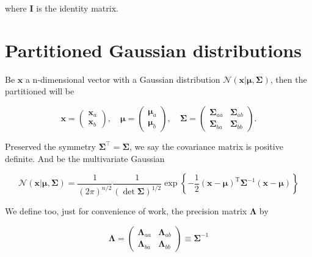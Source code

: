 \begin{appendices}
where $\mathbf{I}$ is the identity matrix.

\vspace{4em}

  \section{Partitioned Gaussian distributions\cite{schon_lindsten}}
  \label{subsec:app-par-gau}

  Be $\mathbf{x}$ a n-dimensional vector with a Gaussian distribution $\mathcal{N}\left( \mathbf{x} | \boldsymbol{\mu}, \boldsymbol{\Sigma} \right)$, then the partitioned will be
  
  \begin{equation}
    \mathbf{x}=
    \begin{pmatrix}
    \mathbf{x}_a \\  
    \mathbf{x}_b 
    \end{pmatrix}
    ,\quad 
    \boldsymbol{\mu}=
    \begin{pmatrix}
      \boldsymbol{\mu}_a \\
      \boldsymbol{\mu}_b
    \end{pmatrix}
    ,\quad 
    \boldsymbol{\Sigma}=
    \begin{pmatrix}
      \boldsymbol{\Sigma}_{aa} & \boldsymbol{\Sigma}_{ab}  \\
      \boldsymbol{\Sigma}_{ba} & \boldsymbol{\Sigma}_{bb}
    \end{pmatrix}
    .
  \end{equation}

  Preserved the symmetry $\boldsymbol{\Sigma}^\top = \boldsymbol{\Sigma}$, we say the covariance matrix is positive definite. And be the multivariate Gaussian

  \begin{equation}
    \label{eq:app-par-gau-multivariate-gaussian}
    \mathcal{N}(\mathbf{x} | \boldsymbol{\mu}, \mathbf{\Sigma})=\frac{1}{(2 \pi)^{n / 2}} \frac{1}{ \left( \det \mathbf{\Sigma} \right) ^{1 / 2}} \exp \left\{-\frac{1}{2}(\mathbf{x}-\boldsymbol{\mu})^{\mathrm{T}} \boldsymbol{\Sigma}^{-1}(\mathbf{x}-\boldsymbol{\mu})\right\}
  \end{equation}

  We define too, just for convenience of work, the precision matrix $\boldsymbol{\Lambda}$ by

  \begin{equation}
    \boldsymbol{\Lambda} = 
    \begin{pmatrix}
      \boldsymbol{\Lambda}_{aa} & \boldsymbol{\Lambda}_{ab}  \\
      \boldsymbol{\Lambda}_{ba} & \boldsymbol{\Lambda}_{bb}
    \end{pmatrix} 
    \equiv \boldsymbol{\Sigma}^{-1}
  \end{equation}


\end{appendices}
